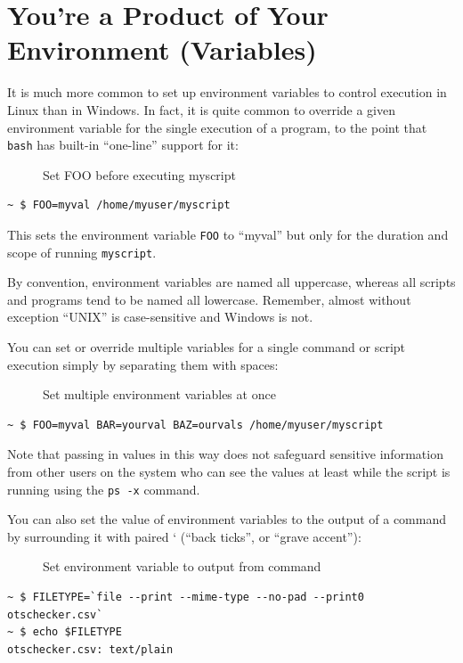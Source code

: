 \documentclass[10pt,]{book}
\numberwithin{figure}{chapter}
\DeclareRobustCommand{\drcap}[1]{\begin{figure}[H]\caption{#1}\end{figure}}
\begin{document}
\section{You're a Product of Your Environment
(Variables)}\label{youre-a-product-of-your-environment-variables}

It is much more common to set up environment variables to control
execution in Linux than in Windows. In fact, it is quite common to
override a given environment variable for the single execution of a
program, to the point that \texttt{bash} has built-in ``one-line''
support for it:

\drcap{Set FOO before executing myscript}

\begin{verbatim}
~ $ FOO=myval /home/myuser/myscript
\end{verbatim}

This sets the environment variable \texttt{FOO} to ``myval'' but only
for the duration and scope of running \texttt{myscript}.

By convention, environment variables are named all uppercase, whereas
all scripts and programs tend to be named all lowercase. Remember,
almost without exception ``UNIX'' is case-sensitive and Windows is not.

You can set or override multiple variables for a single command or
script execution simply by separating them with spaces:

\drcap{Set multiple environment variables at once}

\begin{verbatim}
~ $ FOO=myval BAR=yourval BAZ=ourvals /home/myuser/myscript
\end{verbatim}

Note that passing in values in this way does not safeguard sensitive
information from other users on the system who can see the values at
least while the script is running using the \texttt{ps -x} command.

You can also set the value of environment variables to the output of a
command by surrounding it with paired ` (``back ticks'', or ``grave
accent''):

\drcap{Set environment variable to output from command}

\begin{verbatim}
~ $ FILETYPE=`file --print --mime-type --no-pad --print0 otschecker.csv`
~ $ echo $FILETYPE
otschecker.csv: text/plain
\end{verbatim}
\end{document}
